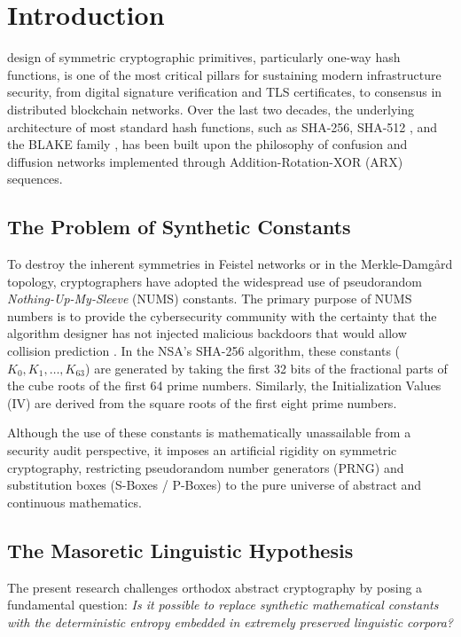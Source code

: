 \documentclass[10pt,journal,compsoc]{IEEEtran}
\begin{document}
\maketitle
\IEEEdisplaynontitleabstractindextext
\IEEEpeerreviewmaketitle

\section{Introduction}
 design of symmetric cryptographic primitives, particularly one-way hash functions, is one of the most critical pillars for sustaining modern infrastructure security, from digital signature verification and TLS certificates, to consensus in distributed blockchain networks. Over the last two decades, the underlying architecture of most standard hash functions, such as SHA-256, SHA-512 \cite{fips180}, and the BLAKE family \cite{aumasson2013blake2}, has been built upon the philosophy of confusion and diffusion networks implemented through Addition-Rotation-XOR (ARX) sequences.

\subsection{The Problem of Synthetic Constants}
To destroy the inherent symmetries in Feistel networks or in the Merkle-Damgård topology, cryptographers have adopted the widespread use of pseudorandom \textit{Nothing-Up-My-Sleeve} (NUMS) constants. The primary purpose of NUMS numbers is to provide the cybersecurity community with the certainty that the algorithm designer has not injected malicious backdoors that would allow collision prediction \cite{schneier1996applied}. In the NSA's SHA-256 algorithm, these constants ($K_0, K_1, \dots, K_{63}$) are generated by taking the first 32 bits of the fractional parts of the cube roots of the first 64 prime numbers. Similarly, the Initialization Values (IV) are derived from the square roots of the first eight prime numbers.

Although the use of these constants is mathematically unassailable from a security audit perspective, it imposes an artificial rigidity on symmetric cryptography, restricting pseudorandom number generators (PRNG) and substitution boxes (S-Boxes / P-Boxes) to the pure universe of abstract and continuous mathematics.

\subsection{The Masoretic Linguistic Hypothesis}
The present research challenges orthodox abstract cryptography by posing a fundamental question: \textit{Is it possible to replace synthetic mathematical constants with the deterministic entropy embedded in extremely preserved linguistic corpora?}
\end{document}
